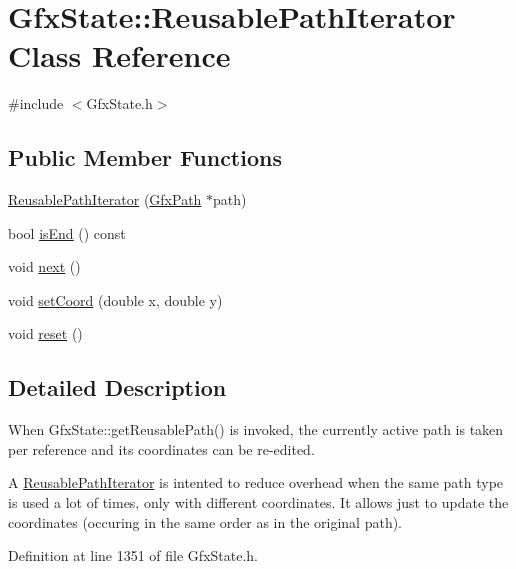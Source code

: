 \hypertarget{class_gfx_state_1_1_reusable_path_iterator}{}\section{Gfx\+State\+:\+:Reusable\+Path\+Iterator Class Reference}
\label{class_gfx_state_1_1_reusable_path_iterator}


{\ttfamily \#include $<$Gfx\+State.\+h$>$}

\subsection*{Public Member Functions}
\begin{DoxyCompactItemize}
\item 
\hyperlink{class_gfx_state_1_1_reusable_path_iterator_a5684cb7996f4e5d90618e82a508547ab}{Reusable\+Path\+Iterator} (\hyperlink{class_gfx_path}{Gfx\+Path} $\ast$path)
\item 
bool \hyperlink{class_gfx_state_1_1_reusable_path_iterator_a044ed0b09dfce40f703700db98c6e1d9}{is\+End} () const
\item 
void \hyperlink{class_gfx_state_1_1_reusable_path_iterator_a9ec26361635eb53e8803b38b0ad86cd9}{next} ()
\item 
void \hyperlink{class_gfx_state_1_1_reusable_path_iterator_af4e893977b96e25d14e64d93bb8a76f1}{set\+Coord} (double x, double y)
\item 
void \hyperlink{class_gfx_state_1_1_reusable_path_iterator_a59f8f6d089eb2ae9b0f28e0b7a37342a}{reset} ()
\end{DoxyCompactItemize}


\subsection{Detailed Description}
When Gfx\+State\+::get\+Reusable\+Path() is invoked, the currently active path is taken per reference and its coordinates can be re-\/edited.

A \hyperlink{class_gfx_state_1_1_reusable_path_iterator}{Reusable\+Path\+Iterator} is intented to reduce overhead when the same path type is used a lot of times, only with different coordinates. It allows just to update the coordinates (occuring in the same order as in the original path). 

Definition at line 1351 of file Gfx\+State.\+h.



